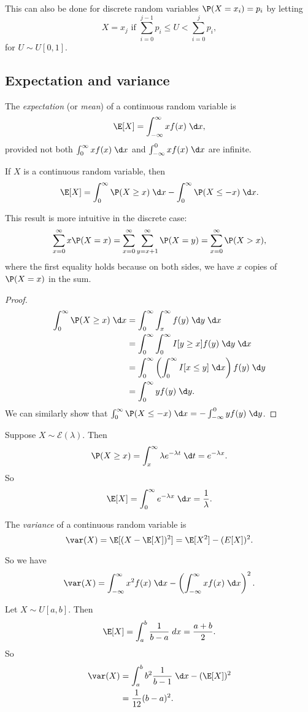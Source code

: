 \documentclass[a4paper]{article}
\begin{document}
\note This can also be done for discrete random variables $\P(X = x_i) = p_i$ by letting
\[
  X = x_j\text{ if }\sum_{i = 0}^{j - 1}p_i \leq U < \sum_{i = 0}^j p_i,
\]
for $U\sim U[0, 1]$.
\subsection{Expectation and variance}
\begin{defi}[Expectation]
  The \emph{expectation} (or \emph{mean}) of a continuous random variable is
  \[
    \E[X] = \int_{-\infty}^\infty xf(x) \;\d x,
  \]
  provided not both $\int_0^\infty xf(x)\;\d x$ and $\int_{-\infty}^0 xf(x) \;\d x$ are infinite.
\end{defi}

\begin{thm}
  If $X$ is a continuous random variable, then
  \[
    \E[X] = \int_0^\infty \P(X \geq x)\;\d x - \int_0^\infty \P(X \leq -x)\;\d x.
  \]
\end{thm}
This result is more intuitive in the discrete case:
\[
  \sum_{x = 0}^\infty x \P(X = x) = \sum_{x = 0}^\infty \sum_{y = x + 1}^\infty \P(X = y) = \sum_{x = 0}^\infty \P(X > x),
\]
where the first equality holds because on both sides, we have $x$ copies of $\P(X = x)$ in the sum.

\begin{proof}
  \begin{align*}
    \int_0^\infty \P(X \geq x)\;\d x &= \int_0^\infty \int_x^\infty f(y)\;\d y\;\d x\\
    &= \int_0^\infty \int_0^\infty I[y\geq x]f(y)\;\d y\;\d x\\
    &= \int_0^\infty \left(\int_0^\infty I[x\leq y]\;\d x\right) f(y)\;\d y\\
    &= \int_0^\infty yf(y)\;\d y.
  \end{align*}
  We can similarly show that $\int_0^\infty \P(X \leq -x)\;\d x = -\int_{-\infty}^0 yf(y)\;\d y$.
\end{proof}

\begin{eg}
  Suppose $X\sim \mathcal{E}(\lambda)$. Then 
  \[
    \P(X \geq x) = \int_x^{\infty} \lambda e^{-\lambda t}\;\d t = e^{-\lambda x}.
  \]
  So
  \[
    \E[X] = \int_0^\infty e^{-\lambda x}\;\d x = \frac{1}{\lambda}.
  \]
\end{eg}

\begin{defi}[Variance]
  The \emph{variance} of a continuous random variable is
  \[
    \var (X) = \E[(X - \E[X])^2] = \E[X^2] - (E[X])^2.
  \]
\end{defi}
So we have
\[
  \var (X) = \int_{-\infty}^\infty x^2 f(x) \;\d x - \left(\int_{-\infty}^\infty xf(x)\;\d x\right)^2.
\]
\begin{eg}
  Let $X\sim U[a, b]$. Then
  \[
    \E[X] = \int_a^b \frac{1}{b - a}\;d x = \frac{a + b}{2}.
  \]
  So
  \begin{align*}
    \var (X) &= \int_a^b b^2\frac{1}{b - 1}\;\d x - (\E[X])^2\\
    &= \frac{1}{12}(b - a)^2.
  \end{align*}
\end{eg}
\end{document}
